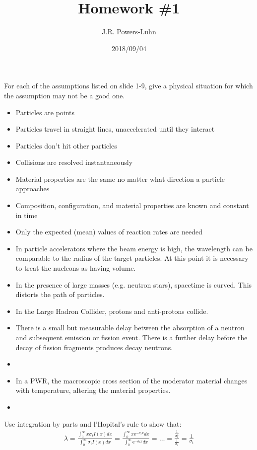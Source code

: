 \documentclass{hw}
\author{J.R. Powers-Luhn}
\date{2018/09/04}
\title{Homework \#1}
\begin{document}
\problem{}
    For each of the assumptions listed on slide 1-9, give a physical situation for which the assumption may not be a good one.
    \begin{itemize}
        \item Particles are points
        \item Particles travel in straight lines, unaccelerated until they interact
        \item Particles don't hit other particles
        \item Collisions are resolved instantaneously
        \item Material properties are the same no matter what direction a particle approaches
        \item Composition, configuration, and material properties are known and constant in time
        \item Only the expected (mean) values of reaction rates are needed
    \end{itemize}

\solution
    \begin{itemize}
        \item In particle accelerators where the beam energy is high, the wavelength can be comparable to the radius of the target particles. At this point it is necessary to treat the nucleons as having volume.
        \item In the presence of large masses (e.g. neutron stars), spacetime is curved. This distorts the path of particles.
        \item In the Large Hadron Collider, protons and anti-protons collide.
        \item There is a small but measurable delay between the absorption of a neutron and subsequent emission or fission event. There is a further delay before the decay of fission fragments produces decay neutrons.
        \item 
        \item In a PWR, the macroscopic cross section of the moderator material changes with temperature, altering the material properties.
        \item 
    \end{itemize}

\problem{}
    Use integration by parts and l'Hopital's rule to show that:
    \begin{align*}
        \lambda = \frac{\int_0^\infty x \sigma_t I(x) dx}{\int_0^\infty \sigma_t I(x) dx} = \frac{\int_0^\infty x \mathrm{e}^{-\sigma_t x} dx }{\int_0^\infty \mathrm{e}^{-\sigma_t x} dx} = \ldots = \frac{\frac{1}{\sigma_t^2}}{\frac{1}{\sigma_t}} = \frac{1}{\sigma_t} 
    \end{align*}
\end{document}

